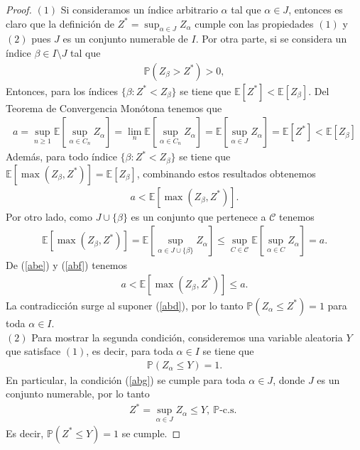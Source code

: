 \begin{proof}
\noindent $(1)$ Si consideramos un índice arbitrario $\alpha$ tal que $\alpha \in J$, entonces es claro que la definición de $Z^{*} = \sup_{\alpha \in J} Z_\alpha$ cumple con las propiedades $(1)$ y $(2)$ pues $J$ es un conjunto numerable de $I$. Por otra parte, si se considera un índice $\beta \in I \setminus J$ tal que
	\begin{align}
	\mathbb{P}(Z_\beta > Z^{*}) > 0, \label{abd}
	\end{align}
Entonces, para los índices $\{ \beta : Z^{*} < Z_\beta\}$ se tiene que $\mathbb{E}[Z^{*}] < \mathbb{E}[Z_\beta]$. Del Teorema de Convergencia Monótona tenemos que 
	\begin{align*}
	a = \sup_{n \geq 1} \mathbb{E} \left[ \sup_{\alpha \in C_n} Z_{\alpha} \right] = \lim_n \mathbb{E}\left[ \sup_{\alpha \in C_n} Z_{\alpha} \right] = \mathbb{E}\left[ \sup_{\alpha \in J} Z_\alpha \right] = \mathbb{E}[Z^{*}] < \mathbb{E}[Z_\beta]
	\end{align*}
Además, para todo índice $\{ \beta : Z^{*} < Z_\beta\}$ se tiene que $\mathbb{E}[\max (Z_\beta, Z^{*})] = \mathbb{E}[Z_\beta]$, combinando estos resultados obtenemos
	\begin{align}
	a < \mathbb{E}[\max (Z_\beta, Z^{*})]. \label{abe}
	\end{align}
Por otro lado, como $J \cup \{\beta\}$ es un conjunto que pertenece a $\mathcal{C}$ tenemos 
	\begin{align}
	\mathbb{E} \left[ \max (Z_\beta, Z^{*}) \right] = \mathbb{E} \left[ \sup_{\alpha \in J \cup \{\beta\}} Z_\alpha \right] \leq \sup_{C \in \mathcal{C}} \mathbb{E} \left[ \sup_{\alpha \in C} Z_{\alpha} \right] = a. \label{abf}
	\end{align}
De (\ref{abe}) y (\ref{abf}) tenemos
	\begin{align*}
	a < \mathbb{E} \left[ \max (Z_\beta, Z^{*}) \right] \leq a.
	\end{align*}
La contradicción surge al suponer (\ref{abd}), por lo tanto $\mathbb{P}(Z_\alpha \leq Z^{*}) = 1$ para toda $\alpha \in I$. \\

\noindent $(2)$ Para mostrar la segunda condición, consideremos una variable aleatoria $Y$ que satisface $(1)$, es decir, para toda $\alpha \in I$ se tiene que
	\begin{align}
	\mathbb{P}(Z_\alpha \leq Y) = 1. \label{abg}
	\end{align}
En particular, la condición (\ref{abg}) se cumple para toda $\alpha \in J$, donde $J$ es un conjunto numerable, por lo tanto
	\begin{align*}
	Z^{*} = \sup_{\alpha \in J} Z_\alpha \leq Y, \ \mathbb{P}\text{-c.s. } 
	\end{align*}
Es decir, $\mathbb{P}(Z^{*} \leq Y) = 1$ se cumple.
\end{proof}

